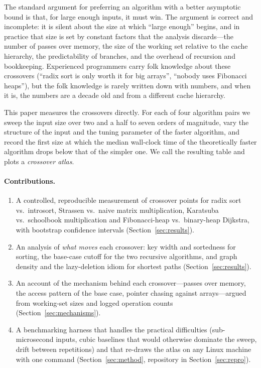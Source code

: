 \documentclass[11pt]{article}
\begin{document}
The standard argument for preferring an algorithm with a better asymptotic
bound is that, for large enough inputs, it must win. The argument is correct and
incomplete: it is silent about the size at which ``large enough'' begins, and in
practice that size is set by constant factors that the analysis discards---the
number of passes over memory, the size of the working set relative to the cache
hierarchy, the predictability of branches, and the overhead of recursion and
bookkeeping. Experienced programmers carry folk knowledge about these
crossovers (``radix sort is only worth it for big arrays'', ``nobody uses
Fibonacci heaps''), but the folk knowledge is rarely written down with numbers,
and when it is, the numbers are a decade old and from a different cache
hierarchy.

This paper measures the crossovers directly. For each of four algorithm pairs
we sweep the input size over two and a half to seven orders of magnitude, vary the
structure of the input and the tuning parameter of the faster algorithm, and
record the first size at which the median wall-clock time of the theoretically
faster algorithm drops below that of the simpler one. We call the resulting
table and plots a \emph{crossover atlas}.

\paragraph{Contributions.}
\begin{enumerate}
  \item A controlled, reproducible measurement of crossover points for radix
  sort vs.\ introsort, Strassen vs.\ naive matrix multiplication, Karatsuba vs.\
  schoolbook multiplication and Fibonacci-heap vs.\ binary-heap Dijkstra, with
  bootstrap confidence intervals (Section~\ref{sec:results}).
  \item An analysis of \emph{what moves} each crossover: key width and
  sortedness for sorting, the base-case cutoff for the two recursive
  algorithms, and graph density and the lazy-deletion idiom for shortest
  paths (Section~\ref{sec:results}).
  \item An account of the mechanism behind each crossover---passes over
  memory, the access pattern of the base case, pointer chasing against
  arrays---argued from working-set sizes and logged operation counts
  (Section~\ref{sec:mechanisms}).
  \item A benchmarking harness that handles the practical difficulties
  (sub-microsecond inputs, cubic baselines that would otherwise dominate the
  sweep, drift between repetitions) and that re-draws the atlas on any Linux
  machine with one command (Section~\ref{sec:method}, repository in
  Section~\ref{sec:repro}).
\end{enumerate}
\end{document}

